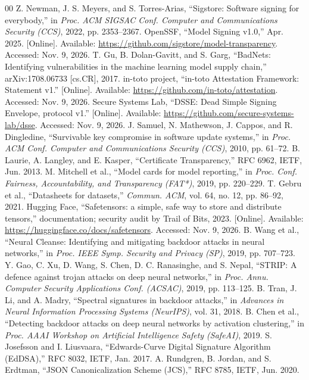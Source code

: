 \documentclass[conference]{IEEEtran}
\begin{document}
\begin{thebibliography}{00}
 Z. Newman, J. S. Meyers, and S. Torres-Arias, ``Sigstore: Software signing for everybody,'' in \emph{Proc. ACM SIGSAC Conf. Computer and Communications Security (CCS)}, 2022, pp. 2353--2367.
 OpenSSF, ``Model Signing v1.0,'' Apr. 2025. [Online]. Available: \url{https://github.com/sigstore/model-transparency}. Accessed: Nov. 9, 2026.
 T. Gu, B. Dolan-Gavitt, and S. Garg, ``BadNets: Identifying vulnerabilities in the machine learning model supply chain,'' arXiv:1708.06733 [cs.CR], 2017.
 in-toto project, ``in-toto Attestation Framework: Statement v1.'' [Online]. Available: \url{https://github.com/in-toto/attestation}. Accessed: Nov. 9, 2026.
 Secure Systems Lab, ``DSSE: Dead Simple Signing Envelope, protocol v1.'' [Online]. Available: \url{https://github.com/secure-systems-lab/dsse}. Accessed: Nov. 9, 2026.
 J. Samuel, N. Mathewson, J. Cappos, and R. Dingledine, ``Survivable key compromise in software update systems,'' in \emph{Proc. ACM Conf. Computer and Communications Security (CCS)}, 2010, pp. 61--72.
 B. Laurie, A. Langley, and E. Kasper, ``Certificate Transparency,'' RFC 6962, IETF, Jun. 2013.
 M. Mitchell et al., ``Model cards for model reporting,'' in \emph{Proc. Conf. Fairness, Accountability, and Transparency (FAT*)}, 2019, pp. 220--229.
 T. Gebru et al., ``Datasheets for datasets,'' \emph{Commun. ACM}, vol. 64, no. 12, pp. 86--92, 2021.
 Hugging Face, ``Safetensors: a simple, safe way to store and distribute tensors,'' documentation; security audit by Trail of Bits, 2023. [Online]. Available: \url{https://huggingface.co/docs/safetensors}. Accessed: Nov. 9, 2026.
 B. Wang et al., ``Neural Cleanse: Identifying and mitigating backdoor attacks in neural networks,'' in \emph{Proc. IEEE Symp. Security and Privacy (SP)}, 2019, pp. 707--723.
 Y. Gao, C. Xu, D. Wang, S. Chen, D. C. Ranasinghe, and S. Nepal, ``STRIP: A defence against trojan attacks on deep neural networks,'' in \emph{Proc. Annu. Computer Security Applications Conf. (ACSAC)}, 2019, pp. 113--125.
 B. Tran, J. Li, and A. Madry, ``Spectral signatures in backdoor attacks,'' in \emph{Advances in Neural Information Processing Systems (NeurIPS)}, vol. 31, 2018.
 B. Chen et al., ``Detecting backdoor attacks on deep neural networks by activation clustering,'' in \emph{Proc. AAAI Workshop on Artificial Intelligence Safety (SafeAI)}, 2019.
 S. Josefsson and I. Liusvaara, ``Edwards-Curve Digital Signature Algorithm (EdDSA),'' RFC 8032, IETF, Jan. 2017.
 A. Rundgren, B. Jordan, and S. Erdtman, ``JSON Canonicalization Scheme (JCS),'' RFC 8785, IETF, Jun. 2020.
\end{thebibliography}
\end{document}
